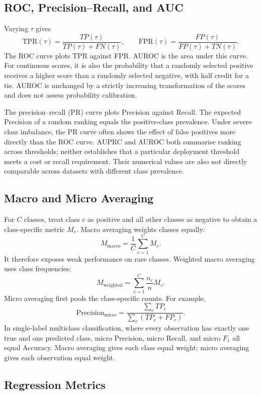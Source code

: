 \subsection{ROC, Precision--Recall, and AUC}

Varying $\tau$ gives
\[
  \mathrm{TPR}(\tau)
  =\frac{TP(\tau)}{TP(\tau)+FN(\tau)},
  \qquad
  \mathrm{FPR}(\tau)
  =\frac{FP(\tau)}{FP(\tau)+TN(\tau)}.
\]
The ROC curve plots TPR against FPR. AUROC is the area under this curve. For continuous scores, it is also the probability that a randomly selected positive receives a higher score than a randomly selected negative, with half credit for a tie. AUROC is unchanged by a strictly increasing transformation of the scores and does not assess probability calibration.

The precision--recall (PR) curve plots Precision against Recall. The expected Precision of a random ranking equals the positive-class prevalence. Under severe class imbalance, the PR curve often shows the effect of false positives more directly than the ROC curve. AUPRC and AUROC both summarise ranking across thresholds; neither establishes that a particular deployment threshold meets a cost or recall requirement. Their numerical values are also not directly comparable across datasets with different class prevalence.

\ThresholdEvaluationFigure

\subsection{Macro and Micro Averaging}

For $C$ classes, treat class $c$ as positive and all other classes as negative to obtain a class-specific metric $M_c$. Macro averaging weights classes equally:
\[
  M_{\mathrm{macro}}=\frac1C\sum_{c=1}^{C}M_c.
\]
It therefore exposes weak performance on rare classes. Weighted macro averaging uses class frequencies:
\[
  M_{\mathrm{weighted}}
  =\sum_{c=1}^{C}\frac{n_c}{n}M_c.
\]
Micro averaging first pools the class-specific counts. For example,
\[
  \mathrm{Precision}_{\mathrm{micro}}
  =\frac{\sum_c TP_c}{\sum_c(TP_c+FP_c)}.
\]
In single-label multiclass classification, where every observation has exactly one true and one predicted class, micro Precision, micro Recall, and micro $F_1$ all equal Accuracy. Macro averaging gives each class equal weight; micro averaging gives each observation equal weight.

\subsection{Regression Metrics}

